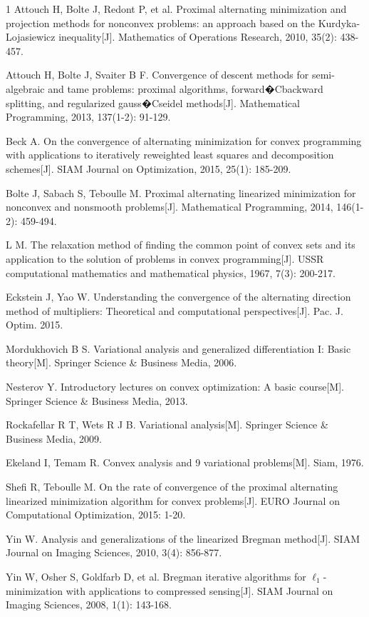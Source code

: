 \documentclass[12pt]{article}
\begin{document}
\begin{thebibliography}{1}
 Attouch H, Bolte J, Redont P, et al. Proximal alternating minimization and projection methods for nonconvex problems: an approach based on the Kurdyka-Lojasiewicz inequality[J]. Mathematics of Operations Research, 2010, 35(2): 438-457.

 Attouch H, Bolte J, Svaiter B F. Convergence of descent methods for semi-algebraic and tame problems: proximal algorithms, forward�Cbackward splitting, and regularized gauss�Cseidel methods[J]. Mathematical Programming, 2013, 137(1-2): 91-129.

Beck A. On the convergence of alternating minimization for convex programming with applications to iteratively reweighted least squares and decomposition schemes[J]. SIAM Journal on Optimization, 2015, 25(1): 185-209.

Bolte J, Sabach S, Teboulle M. Proximal alternating linearized minimization for nonconvex and nonsmooth problems[J]. Mathematical Programming, 2014, 146(1-2): 459-494.

 L M. The relaxation method of finding the common point of convex sets and its application to the solution of problems in convex programming[J]. USSR computational mathematics and mathematical physics, 1967, 7(3): 200-217.

Eckstein J, Yao W. Understanding the convergence of the alternating direction method of multipliers: Theoretical and computational perspectives[J]. Pac. J. Optim.  2015.

Mordukhovich B S. Variational analysis and generalized differentiation I: Basic theory[M]. Springer Science \& Business Media, 2006.

 Nesterov Y. Introductory lectures on convex optimization: A basic course[M]. Springer Science \& Business Media, 2013.

Rockafellar R T, Wets R J B. Variational analysis[M]. Springer Science \& Business Media, 2009.

 Ekeland I, Temam R. Convex analysis and 9 variational problems[M]. Siam, 1976.

Shefi R, Teboulle M. On the rate of convergence of the proximal alternating linearized minimization algorithm for convex problems[J]. EURO Journal on Computational Optimization, 2015: 1-20.

 Yin W. Analysis and generalizations of the linearized Bregman method[J]. SIAM Journal on Imaging Sciences, 2010, 3(4): 856-877.

Yin W, Osher S, Goldfarb D, et al. Bregman iterative algorithms for $\ell_1$-minimization with applications to compressed sensing[J]. SIAM Journal on Imaging Sciences, 2008, 1(1): 143-168.
\end{thebibliography}
\end{document}
